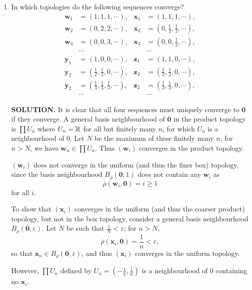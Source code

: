 \documentclass{article}
\begin{document}
\begin{enumerate}
\begin{enumerate}
        \item In which topologies do the following sequences converge?
        \begin{align*}
            \mathbf{w}_1 &= (1, 1, 1, \cdots), &\mathbf{x}_1 &= (1, 1, 1, \cdots), \\
            \mathbf{w}_2 &= (0, 2, 2, \cdots), &\mathbf{x}_2 &= (0, \frac12, \frac12, \cdots), \\
            \mathbf{w}_3 &= (0, 0, 3, \cdots), &\mathbf{x}_3 &= (0, 0, \frac13, \cdots), \\
            &\cdots & &\cdots \\
            \mathbf{y}_1 &= (1, 0, 0, \cdots), &\mathbf{z}_1 &= (1, 1, 0, \cdots), \\
            \mathbf{y}_2 &= (\frac12,\frac12, 0, \cdots), &\mathbf{z}_2 &= (\frac12, \frac12, 0, \cdots), \\
            \mathbf{y}_2 &= (\frac13,\frac13, \frac13, \cdots), &\mathbf{z}_2 &= (\frac13, \frac13, 0, \cdots), \\
            &\cdots & &\cdots
        \end{align*}

        {\bf SOLUTION.} It is clear that all four sequences must uniquely converge to $\mathbf{0}$ if they converge. A general basis neighbourhood of $\mathbf{0}$ in the product topology is $\prod U_n$ where $U_n = \mathbb{R}$ for all but finitely many $n$, for which $U_n$ is a neighbourhood of $0$. Let $N$ be the maximum of these finitely many $n$; for $n > N$, we have $\mathbf{w}_n \in \prod U_n$. Thus $(\mathbf{w}_i)$ converges in the product topology.

        $(\mathbf{w}_i)$ does not converge in the uniform (and thus the finer box) topology, since the  basis neighbourhood $B_{\overline{\rho}}(\mathbf{0}, 1)$ does not contain any $\mathbf{w}_i$ as
        $$\overline{\rho}(\mathbf{w}_i, \mathbf{0}) = i \geq 1$$
        for all $i.$

        To show that $(\mathbf{x}_i)$ converges in the uniform (and thus the coarser product) topology, but not in the box topology, consider a general basis neighbourhood $B_{\overline{\rho}}(\mathbf{0}, \varepsilon)$. Let $N$ be such that $\frac1N < \varepsilon$; for $n>N$,
        $$\overline{\rho}(\mathbf{x}_i, \mathbf{0}) = \frac1n < \varepsilon,$$
        so that $\mathbf{x}_n \in B_{\overline{\rho}}(\mathbf{0}, \varepsilon)$, and thus $(\mathbf{x}_i)$ converges in the uniform topology.

        However, $\prod U_n$ defined by $U_n = (-\frac1n, \frac1n)$ is a neighbourhood of $0$ containing no $\mathbf{x}_i$.


\end{enumerate}
\end{enumerate}
\end{document}
